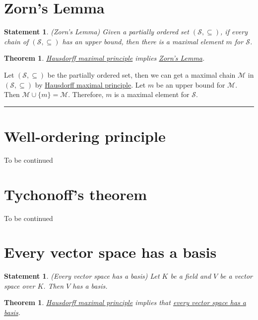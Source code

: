 \documentclass[12pt]{article}
\numberwithin{equation}{section}
\theoremstyle{plain} %
\newtheorem{theorem}[equation]{Theorem}
\newtheorem{statement}[equation]{Statement}
\theoremstyle{definition}
\theoremstyle{remark}
\newenvironment{proof}{{\bf Proof:}}{\hfill\rule{2mm}{2mm}}
\begin{document}
\section{Zorn's Lemma}

\begin{statement}
\label{statement:Zorn's Lemma}
\textup{(Zorn's Lemma)} \textit{Given a partially ordered set $(\mathcal{S}, \subseteq)$, if every chain of $(\mathcal{S}, \subseteq)$ has an upper bound, then there is a maximal element $m$ for $\mathcal{S}$. }
\end{statement}

\begin{theorem}
\hyperref[statement:Hausdorff maximal principle]{Hausdorff maximal principle} implies \hyperref[statement:Zorn's Lemma]{Zorn's Lemma}.
\end{theorem}

\begin{proof}
Let $(\mathcal{S}, \subseteq)$ be the partially ordered set, then we can get a maximal chain  $\mathcal{M}$ in $(\mathcal{S}, \subseteq)$ by \hyperref[statement:Hausdorff maximal principle]{Hausdorff maximal principle}. Let $m$ be an upper bound for $\mathcal{M}$. Then $\mathcal{M} \cup \{m\} = \mathcal{M}$. Therefore, $m$ is a maximal element for $\mathcal{S}$. 
\end{proof}

\section{Well-ordering principle}
To be continued

\section{Tychonoff's theorem}
To be continued

\section{Every vector space has a basis}

\begin{statement}
\label{statement:Every vector space has a basis}
\label{statement:Every vector space has a basis}
\textup{(Every vector space has a basis)} \textit{Let $K$ be a field and ${V}$ be a vector space over ${K}$. Then ${V}$ has a basis.}
\end{statement}

\begin{theorem}
\hyperref[statement:Hausdorff maximal principle]{Hausdorff maximal principle} implies that \hyperref[statement:Every vector space has a basis]{every vector space has a basis}.
\end{theorem}
\end{document}
